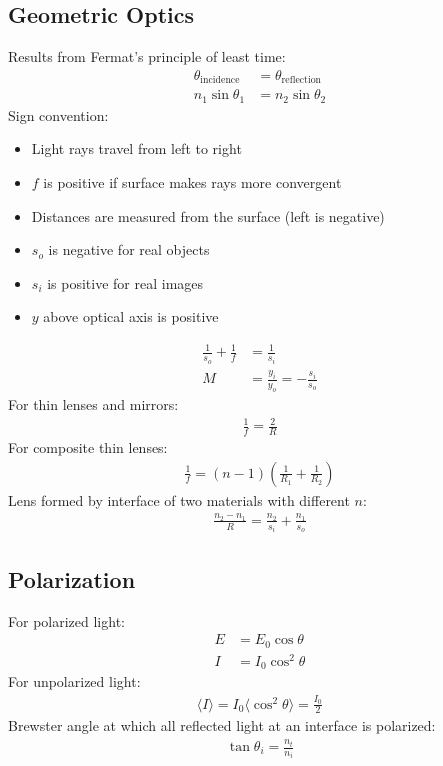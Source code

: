\documentclass[11pt, letterpaper]{article}
\newcommand{\ave}[1]{
  \ensuremath{\langle #1 \rangle}}     %
\begin{document}
\begin{multicols*}{3}
\subsection{Geometric Optics}
Results from Fermat's principle of least time:
\begin{align*}
  \theta_\text{incidence}&=\theta_\text{reflection} \\
  n_1\sin{\theta_1}&=n_2 \sin{\theta_2}
\end{align*}
Sign convention:
\begin{itemize}
\item Light rays travel from left to right
\item $f$ is positive if surface makes rays more convergent
\item Distances are measured from the surface (left is negative)
\item $s_o$ is negative for real objects
\item $s_i$ is positive for real images
\item $y$ above optical axis is positive
\end{itemize}
\begin{align*}
  \frac{1}{s_{o}} +\frac{1}{f} &=\frac{1}{s_{i}}\\
  M&=\frac{y_i}{y_o}=-\frac{s_i}{s_o}
\end{align*}
For thin lenses and mirrors:
\begin{align*}
  \frac{1}{f} = \frac{2}{R}
\end{align*}
For composite thin lenses:
\begin{align*}
  \frac{1}{f} = (n-1)\left(\frac{1}{R_1} + \frac{1}{R_2}\right)
\end{align*}
Lens formed by interface of two materials with different $n$:
\begin{align*}
  \frac{n_2-n_1}{R} = \frac{n_2}{s_i} + \frac{n_1}{s_o}
\end{align*}
\subsection{Polarization}
For polarized light:
\begin{align*}
  E&=E_0\cos{\theta} \\
  I&=I_0\cos^2{\theta}
\end{align*}
For unpolarized light:
\begin{align*}
  \ave{ I }=I_0 \ave{ \cos^2{\theta} } = \frac{I_0}{2}
\end{align*}
Brewster angle at which all reflected light at an interface is polarized:
\begin{align*}
  \tan{\theta_i}=\frac{n_t}{n_i}
\end{align*}

\end{multicols*}
\end{document}
